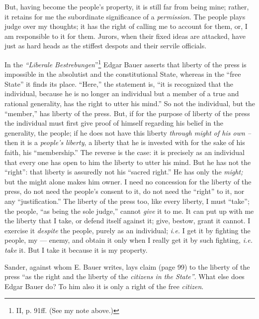 But, having become the people's property, it is still far from being mine; 
rather, it retains for me the subordinate significance of a 
\textit{permission}. The people plays judge over my thoughts; it has the right 
of calling me to account for them, or, I am responsible to it for them. 
Jurors, when their fixed ideas are attacked, have just as hard heads as the 
stiffest despots and their servile officials.

In the \textit{``Liberale Bestrebungen}''\footnote{II, p. 91ff. (See my note 
above.)} Edgar Bauer asserts that liberty of the press is impossible in the 
absolutist and the constitutional State, whereas in the ``free State'' it 
finds its place. ``Here,'' the statement is, ``it is recognized that the 
individual, because he is no longer an individual but a member of a true and 
rational generality, has the right to utter his mind.'' So not the 
individual, but the ``member,'' has liberty of the press. But, if for the 
purpose of liberty of the press the individual must first give proof of 
himself regarding his belief in the generality, the people; if he does not 
have this liberty \textit{through might of his own --} then it is a 
\textit{people's liberty}, a liberty that he is invested with for the sake of 
his faith, his ``membership.'' The reverse is the case: it is precisely as 
an individual that every one has open to him the liberty to utter his mind. 
But he has not the ``right'': that liberty is assuredly not his ``sacred 
right.'' He has only the \textit{might;} but the might alone makes him owner. 
I need no concession for the liberty of the press, do not need the people's 
consent to it, do not need the ``right'' to it, nor any ``justification.'' 
The liberty of the press too, like every liberty, I must ``take''; the 
people, ``as being the sole judge,'' cannot \textit{give} it to me. It can 
put up with me the liberty that I take, or defend itself against it; give, 
bestow, grant it cannot. I exercise it \textit{despite} the people, purely as 
an individual; \textit{i.e.} I get it by fighting the people, my --- enemy, and 
obtain it only when I really get it by such fighting, \textit{i.e. take} it. 
But I take it because it is my property.

Sander, against whom E. Bauer writes, lays claim (page 99) to the liberty of 
the press ``as the right and the liberty of the \textit{citizens in the 
State''}. What else does Edgar Bauer do? To him also it is only a right of 
the free \textit{citizen}.

